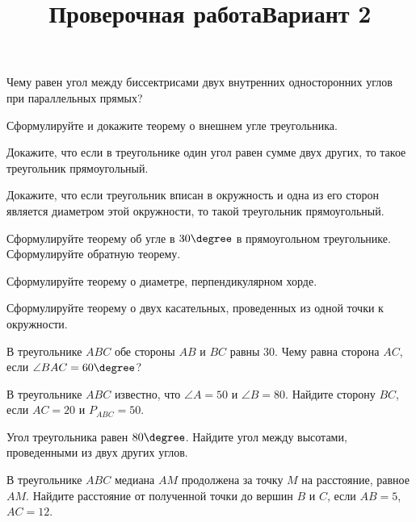 \newpage
\title{Проверочная работа}
\title{Вариант 2}
\begin{listofex}
	\item
	\begin{enumcols}[itemcolumns=1]
		\item Чему равен угол между биссектрисами двух внутренних односторонних углов при параллельных прямых?
		\item Сформулируйте и докажите теорему о внешнем угле треугольника.
		\item Докажите, что если в треугольнике один угол равен сумме двух других, то такое треугольник прямоугольный.
		\item Докажите, что если треугольник вписан в окружность и одна из его сторон является диаметром этой окружности, то такой треугольник прямоугольный.
		\item Сформулируйте теорему об угле в \( 30\degree \) в прямоугольном треугольнике. Сформулируйте обратную теорему.
		\item Сформулируйте теорему о диаметре, перпендикулярном хорде.
		\item Сформулируйте теорему о двух касательных, проведенных из одной точки к окружности.
	\end{enumcols}
	\item В треугольнике \( ABC \) обе стороны \( AB \) и \( BC \) равны \( 30 \). Чему равна сторона \( AC \), если \( \angle BAC = 60 \degree \)?
	\item В треугольнике \( ABC \) известно, что \( \angle A = 50 \) и \( \angle B = 80 \). Найдите сторону \( BC \), если \( AC = 20 \) и \( P_{ABC}=50 \).
	\item Угол треугольника равен \( 80\degree \). Найдите угол между высотами, проведенными из двух других углов.
	\item {}
	\item {}
	\item В треугольнике \( ABC \) медиана \( AM \) продолжена за точку \( M \) на расстояние, равное \( AM \). Найдите расстояние от полученной точки до вершин \( B  \) и \( C\), если \( AB = 5\), \( AC = 12\).
	\item {}
\end{listofex}